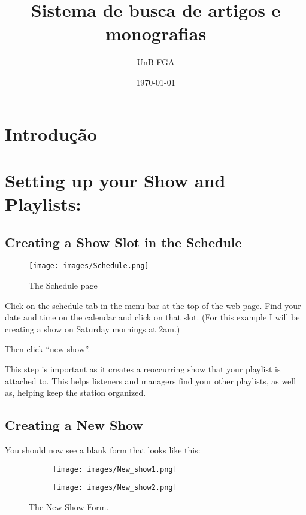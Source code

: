 \documentclass[12pt]{article}
\title{Sistema de busca de artigos e monografias}
\author{UnB-FGA}
\date{\today}
\begin{document}
\maketitle{}

\tableofcontents

\clearpage
\newpage

\section{Introdução}




\clearpage
\newpage

\section{Setting up your Show and Playlists:}


\subsection{Creating a Show Slot in the Schedule}

\begin{wrapfigure}{r}{0.4\textwidth}
    \texttt{[image: images/Schedule.png]}
    \caption{The Schedule page}
    \label{fig7}
\end{wrapfigure}

Click on the schedule tab in the menu bar at the top of the web-page.
Find your date and time on the calendar and click on that slot. (For this example I will be creating a show on Saturday mornings at 2am.)

Then click ``new show''.

\hrulefill

This step is important as it creates a reoccurring show that your playlist is attached to. This helps listeners and managers find your other playlists, as well as, helping keep the station organized.

\hrulefill

\vspace{1cm}

\subsection{Creating a New Show}

You should now see a blank form that looks like this:

\begin{figure}[h]
 
    \begin{subfigure}{0.5\textwidth}
    \texttt{[image: images/New\_show1.png]} 
    \label{fig:NS1}
    \end{subfigure}
    \begin{subfigure}{0.5\textwidth}
    \texttt{[image: images/New\_show2.png]}
    \label{fig:NS2}
    \end{subfigure}
 
\caption{The New Show Form.}
\label{fig8}
\end{figure}
\end{document}

